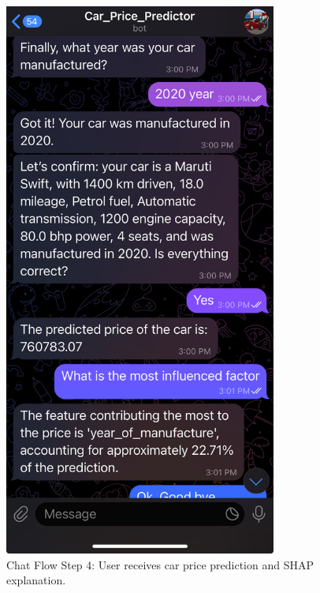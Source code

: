 \documentclass{beamer}
\begin{document}
\begin{frame}
\begin{figure}[h!]
\begin{minipage}{0.45\textwidth}
        \centering
        \includegraphics[width=0.8\textwidth]{4.jpg}
        \caption{Chat Flow Step 4: User receives car price prediction and SHAP explanation.}
        \label{fig:step4}
    \end{minipage}
\end{figure}

\end{frame}
\end{document}
